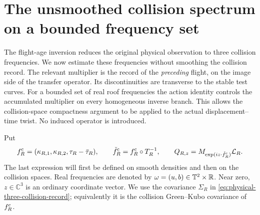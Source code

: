 \section{The unsmoothed collision spectrum on a bounded frequency set}
\label{sec:compact-collision-spectrum}
The flight-age inversion reduces the original physical observation to
three collision frequencies. We now estimate these frequencies without
smoothing the collision record. The relevant multiplier is the record
of the \emph{preceding} flight, on the image side of the transfer
operator. Its discontinuities are transverse to the stable test curves.
For a bounded set of real roof frequencies the action identity controls
the accumulated multiplier on every homogeneous inverse branch. This
allows the collision-space compactness argument to be applied to the
actual displacement--time twist. No induced operator is introduced.

Put
\[
 f_R^{\rm c}=(\kappa_{R,1},\kappa_{R,2},\tau_R-\bar\tau_R),\qquad
 \check f_R^{\rm c}=f_R^{\rm c}\circ T_R^{-1},\qquad
 Q_{R,z}=M_{\exp(i z\cdot\check f_R^{\rm c})}\mathcal L_R.
\]
The last expression will first be defined on smooth densities and then
on the collision spaces. Real frequencies are denoted by
$\omega=(u,b)\in\mathbb T^2\times\mathbb R$. Near zero, $z\in\mathbb C^3$ is
an ordinary coordinate vector. We use the covariance $\Sigma_R$ in
\eqref{eq:physical-three-collision-record}; equivalently it is the
collision Green--Kubo covariance of $f_R^{\rm c}$.

